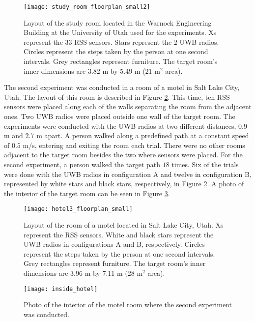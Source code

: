 \documentclass[conference]{IEEEtran}
\begin{document}
\begin{figure}[t!]
    \centerline{\texttt{[image: study\_room\_floorplan\_small2]}}
    \caption{Layout of the study room located in the Warnock
      Engineering Building at the University of Utah used for the
      experiments. Xs represent the $33$ RSS sensors. Stars represent
      the $2$ UWB radios. Circles represent the steps taken by the
      person at one second intervals. Grey rectangles represent
      furniture. The target room's inner dimensions are $3.82$ m by
      $5.49$ m ($21$ m$^{2}$ area).}
    \label{fig:study_room_layout}
\end{figure}

The second experiment was conducted in a room of a motel in Salt Lake
City, Utah. The layout of this room is described in Figure
\ref{fig:hotel_layout}. This time, ten RSS sensors were placed along
each of the walls separating the room from the adjacent ones. Two UWB
radios were placed outside one wall of the target room. The
experiments were conducted with the UWB radios at two different
distances, $0.9$ m and $2.7$ m apart. A person walked along a
predefined path at a constant speed of $0.5$ m/s, entering and exiting
the room each trial. There were no other rooms adjacent to the target
room besides the two where sensors were placed.  For the second
experiment, a person walked the target path $18$ times. Six of the
trials were done with the UWB radios in configuration A and twelve in
configuration B, represented by white stars and black stars,
respectively, in Figure \ref{fig:hotel_layout}. A photo of the
interior of the target room can be seen in Figure
\ref{fig:inside_hotel}.

\begin{figure}[t!]
    \centerline{\texttt{[image: hotel3\_floorplan\_small]}}
    \caption{Layout of the room of a motel located in Salt Lake City,
      Utah. Xs represent the RSS sensors. White and black stars
      represent the UWB radios in configurations A and B,
      respectively. Circles represent the steps taken by the person at
      one second intervals. Grey rectangles represent furniture. The
      target room's inner dimensions are 3.96 m by 7.11 m ($28$
      m$^{2}$ area).}
    \label{fig:hotel_layout}
\end{figure}

\begin{figure}[t!]
    \centerline{\texttt{[image: inside\_hotel]}}
    \caption{Photo of the interior of the motel room where the second
      experiment was conducted.}
    \label{fig:inside_hotel}
\end{figure}
\end{document}
